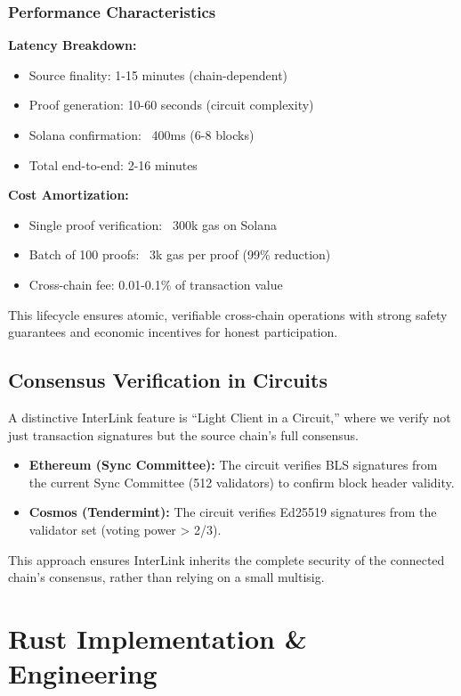 \documentclass[11pt,a4paper]{article}
\begin{document}
\subsubsection*{Performance Characteristics}

\textbf{Latency Breakdown:}
\begin{itemize}
    \item Source finality: 1-15 minutes (chain-dependent)
    \item Proof generation: 10-60 seconds (circuit complexity)
    \item Solana confirmation: ~400ms (6-8 blocks)
    \item Total end-to-end: 2-16 minutes
\end{itemize}

\textbf{Cost Amortization:}
\begin{itemize}
    \item Single proof verification: ~300k gas on Solana
    \item Batch of 100 proofs: ~3k gas per proof (99\% reduction)
    \item Cross-chain fee: 0.01-0.1\% of transaction value
\end{itemize}

This lifecycle ensures atomic, verifiable cross-chain operations with strong safety guarantees and economic incentives for honest participation.

\subsection{Consensus Verification in Circuits}
A distinctive InterLink feature is ``Light Client in a Circuit,'' where we verify not just transaction signatures but the source chain's full consensus.
\begin{itemize}
    \item \textbf{Ethereum (Sync Committee):} The circuit verifies BLS signatures from the current Sync Committee (512 validators) to confirm block header validity.
    \item \textbf{Cosmos (Tendermint):} The circuit verifies Ed25519 signatures from the validator set (voting power > 2/3).
\end{itemize}
This approach ensures InterLink inherits the complete security of the connected chain's consensus, rather than relying on a small multisig.

\section{Rust Implementation \& Engineering}
\label{sec:impl}
\end{document}
